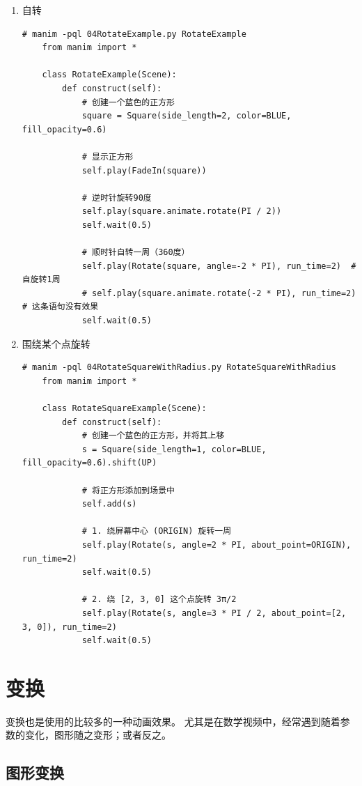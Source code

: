 \begin{enumerate}[label=\arabic*)]
    \item 自转
    \begin{lstlisting}[style=pythonstyle]
    # manim -pql 04RotateExample.py RotateExample
    from manim import *
    
    class RotateExample(Scene):
        def construct(self):
            # 创建一个蓝色的正方形
            square = Square(side_length=2, color=BLUE, fill_opacity=0.6)
    
            # 显示正方形
            self.play(FadeIn(square))
    
            # 逆时针旋转90度
            self.play(square.animate.rotate(PI / 2))
            self.wait(0.5)
    
            # 顺时针自转一周（360度）
            self.play(Rotate(square, angle=-2 * PI), run_time=2)  # 自旋转1周
            # self.play(square.animate.rotate(-2 * PI), run_time=2) # 这条语句没有效果
            self.wait(0.5)
    \end{lstlisting}
    \item 围绕某个点旋转
    \begin{lstlisting}[style=pythonstyle]
    # manim -pql 04RotateSquareWithRadius.py RotateSquareWithRadius
    from manim import *

    class RotateSquareExample(Scene):
        def construct(self):
            # 创建一个蓝色的正方形，并将其上移
            s = Square(side_length=1, color=BLUE, fill_opacity=0.6).shift(UP)
            
            # 将正方形添加到场景中
            self.add(s)
            
            # 1. 绕屏幕中心 (ORIGIN) 旋转一周
            self.play(Rotate(s, angle=2 * PI, about_point=ORIGIN), run_time=2)
            self.wait(0.5)
            
            # 2. 绕 [2, 3, 0] 这个点旋转 3π/2
            self.play(Rotate(s, angle=3 * PI / 2, about_point=[2, 3, 0]), run_time=2)
            self.wait(0.5)
    \end{lstlisting}
\end{enumerate}

\section{变换}
\label{sec:manim_animation_transform}
变换也是使用的比较多的一种动画效果。 尤其是在数学视频中，经常遇到随着参数的变化，图形随之变形；或者反之。
\subsection{图形变换}
\label{subsubsec:manim_animation_transform_shape}

